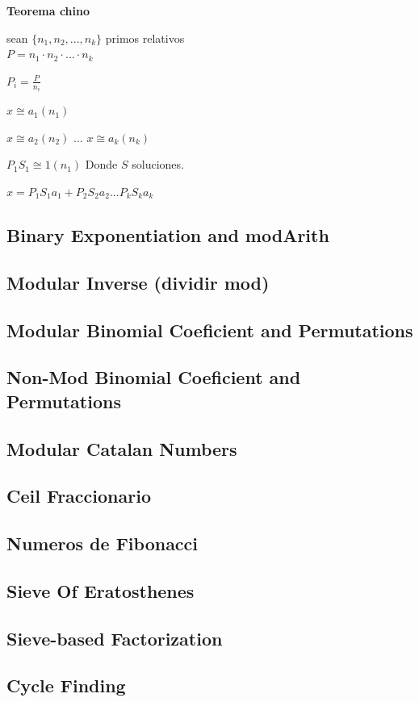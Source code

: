 \textbf{Teorema chino}

sean $\{n_{1}, n_{2},..., n_{k} \}$ primos relativos\\

$P = n_{1}\cdot n_{2}\cdot ...\cdot n_{k}$

$P_{i} = \frac{P}{n_{i}}$

$x\cong a_{1}(n_{1})$

$x\cong a_{2}(n_{2})$
$...$
$x\cong a_{k}(n_{k})$

$P_{1}S_{1} \cong 1(n_{1})$ Donde $S$ soluciones.

$x = P_{1}S_{1}a_{1} + P_{2}S_{2}a_{2} ... P_{k}S_{k}a_{k}$


\subsection{Binary Exponentiation and modArith}
\subsection{Modular Inverse (dividir mod)}
\subsection{Modular Binomial Coeficient and Permutations}
\subsection{Non-Mod Binomial Coeficient and Permutations}
\subsection{Modular Catalan Numbers}
\subsection{Ceil Fraccionario}
\subsection{Numeros de Fibonacci}
\subsection{Sieve Of Eratosthenes}
\subsection{Sieve-based Factorization}
\subsection{Cycle Finding}
